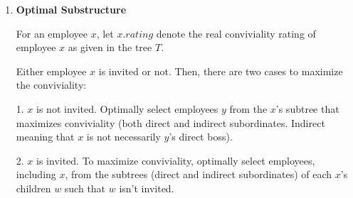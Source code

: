 \documentclass[a4paper]{report}
\begin{document}
\begin{enumerate}
      We assume that the ``.'' (period) indicates a concatenation of strings like in PHP. 

      Initially, call $printLPS$($1, m, d, W, subsequence$).

      \begin{algorithmic}[1]
            \State return $subsequence$
            \State return $subsequence$ . $W[j]$
            \State return $printLPS(i+1, j, d, W, subsequence)$
            \State return $W[i]$ . $printLPS(i+1, j-1, d, W, subsequence)$ . $W[j]$
            \State return $printLPS(i, j-1, d, W, subsequence)$
          \EndIf
        \EndFunction
      \end{algorithmic}

      {\it Time and Space Complexity:}
      The algorithm can run through at most $m$ rows and $m$ columns. Thus, it runs $\Theta(m)$.

      No additional space complexity is added because $C$ and $d$ were already defined by the $calcPalindrome$ function. 

      Thus the entire algorithm's ($calcPalindrome$ and $printLPS$) space complexity is still $\Theta(m^2)$.

    \bigskip
    \setcounter{equation}{0}
    \item 

      {\bf Optimal Substructure}

      For an employee $x$, let $x.rating$ denote the real conviviality rating of employee $x$ as given in the tree $T$. 

      Either employee $x$ is invited or not. Then, there are two cases to maximize the conviviality: 

      1. $x$ is not invited. Optimally select employees $y$ from the $x$'s subtree that maximizes conviviality (both direct and indirect subordinates. 
      Indirect meaning that $x$ is not necessarily $y$'s direct boss).
      
      2. $x$ is invited. To maximize conviviality, optimally select employees, including $x$, from the subtrees (direct and indirect subordinates) of each $x$'s children
      $w$ such that $w$ isn't invited.



\end{enumerate}
\end{document}
